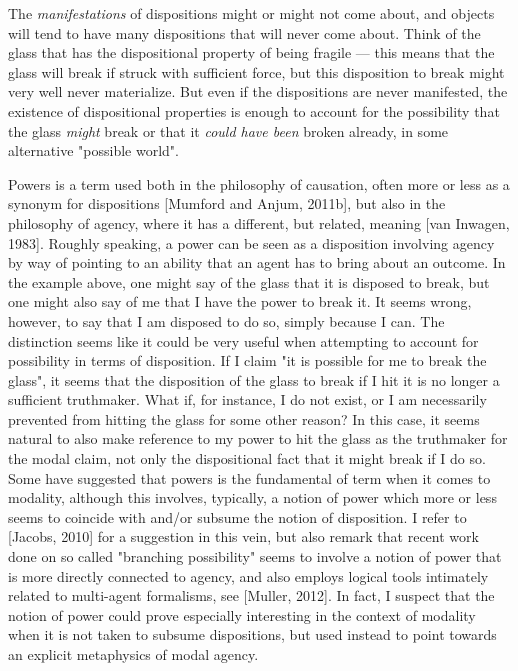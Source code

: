\documentclass{article}
\begin{document}
The \emph{manifestations} of dispositions might or might not come about, and objects will tend to have many dispositions that will never come about. Think of the glass that has the dispositional property of being fragile --- this means that the glass will break if struck with sufficient force, but this disposition to break might very well never materialize. But even if the dispositions are never manifested, the existence of dispositional properties is enough to account for the possibility that the glass \emph{might} break or that it \emph{could have been} broken already, in some alternative "possible world".

Powers is a term used both in the philosophy of causation, often more or less as a
synonym for dispositions [Mumford and Anjum, 2011b], but also in the philosophy of
agency, where it has a different, but related, meaning [van Inwagen, 1983]. Roughly
speaking, a power can be seen as a disposition involving agency by way of pointing to
an ability that an agent has to bring about an outcome. In the example above, one
might say of the glass that it is disposed to break, but one might also say of me that
I have the power to break it. It seems wrong, however, to say that I am disposed to
do so, simply because I can.
The distinction seems like it could be very useful when attempting to account for
possibility in terms of disposition. If I claim "it is possible for me to break the glass",
it seems that the disposition of the glass to break if I hit it is no longer a sufficient
truthmaker. What if, for instance, I do not exist, or I am necessarily prevented from
hitting the glass for some other reason? In this case, it seems natural to also make
reference to my power to hit the glass as the truthmaker for the modal claim, not only the dispositional fact that it might break if I do so. Some have suggested that
powers is the fundamental of term when it comes to modality, although this involves,
typically, a notion of power which more or less seems to coincide with and/or subsume
the notion of disposition. I refer to [Jacobs, 2010] for a suggestion in this vein, but also
remark that recent work done on so called "branching possibility" seems to involve a
notion of power that is more directly connected to agency, and also employs logical
tools intimately related to multi-agent formalisms, see [Muller, 2012].
In fact, I suspect that the notion of power could prove especially interesting in the
context of modality when it is not taken to subsume dispositions, but used instead
to point towards an explicit metaphysics of modal agency.
\end{document}
